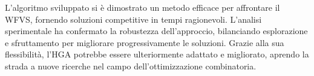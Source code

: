 \documentclass[a4paper,12pt]{article}
\begin{document}
L'algoritmo sviluppato si è dimostrato un metodo efficace per affrontare il WFVS, fornendo soluzioni competitive in tempi ragionevoli. L'analisi sperimentale ha confermato la robustezza dell'approccio, bilanciando esplorazione e sfruttamento per migliorare progressivamente le soluzioni. Grazie alla sua flessibilità, l'HGA potrebbe essere ulteriormente adattato e migliorato, aprendo la strada a nuove ricerche nel campo dell'ottimizzazione combinatoria.

\newpage


\nocite{*}
\end{document}
